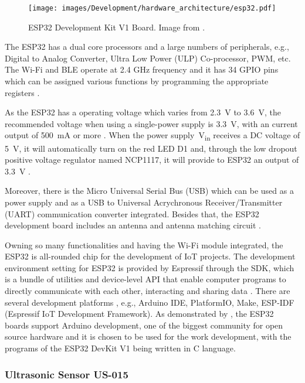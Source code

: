 \begin{figure}[h!]
    \centering
    \texttt{[image: images/Development/hardware\_architecture/esp32.pdf]}
    \label{fig:esp32}
    \caption{ESP32 Development Kit V1 Board. Image from \cite{datasheet:ESP32}.}
\end{figure}

The ESP32 has a dual core processors and a large numbers of peripherals, e.g., Digital to Analog Converter, Ultra Low Power (ULP) Co-processor, \gls{PWM}, etc. The Wi-Fi and \gls{BLE} operate at 2.4 GHz frequency and it has 34 \gls{GPIO} pins which can be assigned various functions by programming the appropriate registers \cite{datasheet:ESP32}. 

As the ESP32 has a operating voltage which varies from 2.3~V to 3.6~V, the recommended voltage when using a single-power supply is 3.3~V, with an current output of 500~mA or more \cite{datasheet:ESP32}. When the power supply~V\textsubscript{in} receives a \gls{DC} voltage of 5~V, it will automatically turn on the red \gls{LED} D1 and, through the low dropout positive voltage regulator named NCP1117, it will provide to ESP32 an output of 3.3~V \cite{datasheet:NCP1117}. 

Moreover, there is the Micro Universal Serial Bus (USB) which can be used as a power supply and as a USB to Universal Acrychronous Receiver/Transmitter (UART) communication converter integrated. Besides that, the ESP32 development board includes an antenna and antenna matching circuit \cite{datasheet:ESP32}.

Owning so many functionalities and having the Wi-Fi module integrated, the ESP32 is all-rounded chip for the development of \gls{IoT} projects. The development environment setting for ESP32 is provided by Espressif through the \gls{SDK}, which is a bundle of utilities and device-level \gls{API} that enable computer programs to directly communicate with each other, interacting and sharing data \cite{FELKE-MORRIS:2019}. There are several development platforms \cite{ESPRESSIF:ESP32}, e.g., Arduino \gls{IDE}, PlatformIO, Make, ESP-IDF (Espressif \gls{IoT} Development Framework). As demonstrated by \cite{KURNIAWAN:2019}, the ESP32 boards support Arduino development, one of the biggest community for open source hardware and it is chosen to be used for the work development, with the programs of the ESP32 DevKit V1 being written in C language.


\subsubsection{Ultrasonic Sensor US-015}

